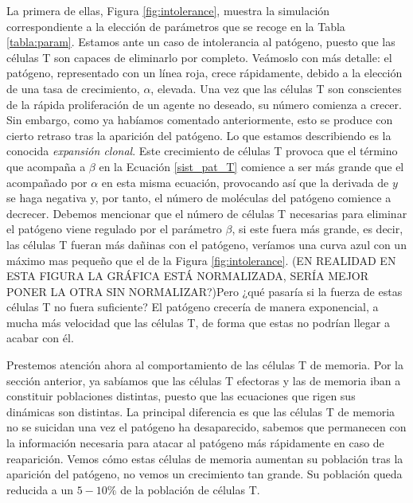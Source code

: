 La primera de ellas, Figura \ref{fig:intolerance}, muestra la simulación correspondiente a la elección de parámetros que se recoge en la Tabla \ref{tabla:param}. Estamos ante un caso de intolerancia al patógeno, puesto que las células T son capaces de eliminarlo por completo. 
Veámoslo con más detalle: el patógeno, representado con un línea roja, crece rápidamente, debido a la elección de una tasa de crecimiento, $\alpha$, elevada. Una vez que las células T son conscientes de la rápida proliferación de un agente no deseado, su número comienza a crecer. Sin embargo, como ya habíamos comentado anteriormente, esto se produce con cierto retraso tras la aparición del patógeno. Lo que estamos describiendo es la conocida \textit{expansión clonal}. Este crecimiento de células T provoca que el término que acompaña a $\beta$ en la Ecuación \ref{sist_pat_T} comience a ser más grande que el acompañado por $\alpha$ en esta misma ecuación, provocando así que la derivada de $y$ se haga negativa y, por tanto, el número de moléculas del patógeno comience a decrecer. Debemos mencionar que el número de células T necesarias para eliminar el patógeno viene regulado por el parámetro $\beta$, si este fuera más grande, es decir, las células T fueran más dañinas con el patógeno, veríamos una curva azul con un máximo mas pequeño que el de la Figura \ref{fig:intolerance}. (EN REALIDAD EN ESTA FIGURA LA GRÁFICA ESTÁ NORMALIZADA, SERÍA MEJOR PONER LA OTRA SIN NORMALIZAR?)Pero ¿qué pasaría si la fuerza de estas células T no fuera suficiente? El patógeno crecería de manera exponencial, a mucha más velocidad que las células T, de forma que estas no podrían llegar a acabar con él. 

Prestemos atención ahora al comportamiento de las células T de memoria. Por la sección anterior, ya sabíamos que las células T efectoras y las de memoria iban a constituir poblaciones distintas, puesto que las ecuaciones que rigen sus dinámicas son distintas. La principal diferencia es que las células T de memoria no se suicidan una vez el patógeno ha desaparecido, sabemos que permanecen con la información necesaria para atacar al patógeno más rápidamente en caso de reaparición. Vemos cómo estas células de memoria aumentan su población tras la aparición del patógeno, no vemos un crecimiento tan grande. Su población queda reducida a un $5-10\%$ de la población de células T.



